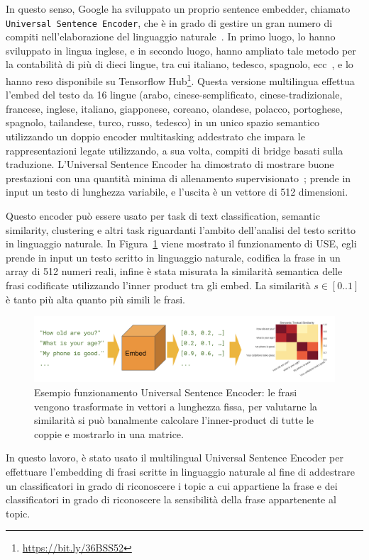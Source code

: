 In questo senso, Google ha sviluppato un proprio sentence embedder, chiamato {\tt Universal Sentence Encoder}, che è in grado di gestire un gran numero di compiti nell'elaborazione del linguaggio naturale~\cite{USE}. In primo luogo, lo hanno sviluppato in lingua inglese, e in secondo luogo, hanno ampliato tale metodo per la contabilità di più di dieci lingue, tra cui italiano, tedesco, spagnolo, ecc~\cite{yang2019multilingue}, e lo hanno reso disponibile su Tensorflow Hub\footnote{\url{https://bit.ly/36BSS52}}. Questa versione multilingua effettua l'embed del testo da 16 lingue (arabo, cinese-semplificato, cinese-tradizionale, francese, inglese, italiano, giapponese, coreano, olandese, polacco, portoghese, spagnolo, tailandese, turco, russo, tedesco) in un unico spazio semantico utilizzando un doppio encoder multitasking addestrato che impara le rappresentazioni legate utilizzando, a sua volta, compiti di bridge basati sulla traduzione. L'Universal Sentence Encoder ha dimostrato di mostrare buone prestazioni con una quantità minima di allenamento supervisionato~\cite{USE}; prende in input un testo di lunghezza variabile, e l'uscita è un vettore di 512 dimensioni. 

Questo encoder può essere usato per task di text classification, semantic similarity, clustering e altri task riguardanti l'ambito dell'analisi del testo scritto in linguaggio naturale.\newline
In Figura~\ref{fig:my_label} viene mostrato il funzionamento di USE, egli prende in input un testo scritto in linguaggio naturale, codifica la frase in un array di 512 numeri reali, infine è stata misurata la similarità semantica delle frasi codificate utilizzando l'inner product tra gli embed. La similarità $s \in [0..1]$ è tanto più alta quanto più simili le frasi. 
\begin{figure}[h]
    \centering
    \includegraphics [scale=0.33]{Figure/use.png}
    \caption{Esempio funzionamento Universal Sentence Encoder: le frasi vengono trasformate in vettori a lunghezza fissa, per valutarne la similarità si può banalmente calcolare l'inner-product di tutte le coppie e mostrarlo in una matrice.}
    \label{fig:my_label}
\end{figure}
\FloatBarrier
In questo lavoro, è stato usato il multilingual Universal Sentence Encoder per effettuare l'embedding di frasi scritte in linguaggio naturale al fine di addestrare un classificatori in grado di riconoscere i topic a cui appartiene la frase e dei classificatori in grado di riconoscere la sensibilità della frase appartenente al topic.